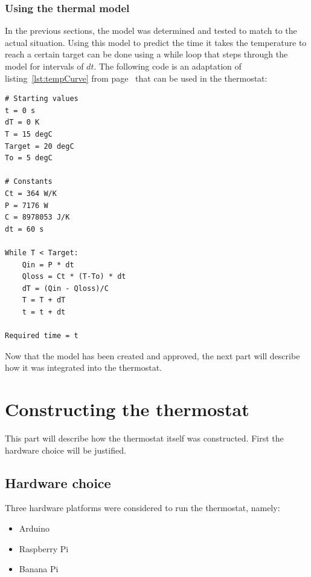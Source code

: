 \documentclass[12pt,a4paper,final]{report}
\begin{document}
\section{Using the thermal model} \label{sec:usingModel}
In the previous sections, the model was determined and tested to match to the actual situation. Using this model to predict the time it takes the temperature to reach a certain target can be done using a while loop that steps through the model for intervals of $dt$. The following code is an adaptation of listing~\ref{lst:tempCurve} from page~\pageref{lst:tempCurve} that can be used in the thermostat:
\lstset{language=Python}
\begin{lstlisting}[caption={(pseudocode) calculating the heating time from 15 to 20 degrees with a constant outside temperature of 5 degrees}]
# Starting values
t = 0 s
dT = 0 K
T = 15 degC 
Target = 20 degC
To = 5 degC

# Constants
Ct = 364 W/K
P = 7176 W
C = 8978053 J/K
dt = 60 s

While T < Target:
	Qin = P * dt
	Qloss = Ct * (T-To) * dt
	dT = (Qin - Qloss)/C
	T = T + dT
	t = t + dt

Required time = t
\end{lstlisting}
Now that the model has been created and approved, the next part will describe how it was integrated into the thermostat.

\part{Constructing the thermostat} \label{part:ConstructThermostat}
This part will describe how the thermostat itself was constructed. First the hardware choice will be justified.
\chapter{Hardware choice} \label{chap:HardwareChoice}
Three hardware platforms were considered to run the thermostat, namely:
\begin{itemize}
  \item Arduino
  \item Raspberry Pi
  \item Banana Pi
\end{itemize}
\end{document}
